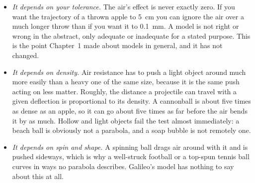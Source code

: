 \documentclass[11pt,twoside,openany]{book}
\begin{document}
\begin{itemize}[itemsep=3pt]
  \item \emph{It depends on your tolerance.} The air's effect is never exactly zero. If you want the trajectory of a thrown apple to \SI{5}{\centi\metre} you can ignore the air over a much longer throw than if you want it to \SI{0.1}{\milli\metre}. A model is not right or wrong in the abstract, only adequate or inadequate for a stated purpose. This is the point Chapter~1 made about models in general, and it has not changed.
  \item \emph{It depends on density.} Air resistance has to push a light object around much more easily than a heavy one of the same size, because it is the same push acting on less matter. Roughly, the distance a projectile can travel with a given deflection is proportional to its density. A cannonball is about five times as dense as an apple, so it can go about five times as far before the air bends it by as much. Hollow and light objects fail the test almost immediately: a beach ball is obviously not a parabola, and a soap bubble is not remotely one.
  \item \emph{It depends on spin and shape.} A spinning ball drags air around with it and is pushed sideways, which is why a well-struck football or a top-spun tennis ball curves in ways no parabola describes. Galileo's model has nothing to say about this at all.
\end{itemize}
\end{document}
